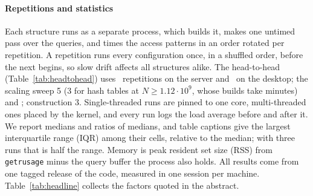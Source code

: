 \documentclass[preprint,12pt]{elsarticle}
\begin{document}
\paragraph{Repetitions and statistics} Each structure runs as a separate process,
which builds it, makes one untimed pass over the queries, and times the access
patterns in an order rotated per repetition. A repetition runs every configuration
once, in a shuffled order, before the next begins, so slow drift affects all
structures alike. The head-to-head (Table~\ref{tab:headtohead}) uses \hReps\ repetitions on the server and
\hRepsDesk\ on the desktop; the scaling sweep 5 (3 for hash tables at
$N\ge1.12\cdot10^9$, whose builds take minutes) and \hDeskSweepReps; construction 3. Single-threaded runs are pinned to one core, multi-threaded ones placed by the kernel, and every run logs the load average before and after it. We report medians and ratios of
medians, and table captions give the largest interquartile range (IQR) among
their cells, relative to the median; with three runs that is half the range. Memory is peak resident set size (RSS) from
\texttt{getrusage} minus the query buffer the process also holds. All results come
from one tagged release of the code, measured in one session per machine.
Table~\ref{tab:headline} collects the factors quoted in the abstract.
\end{document}
